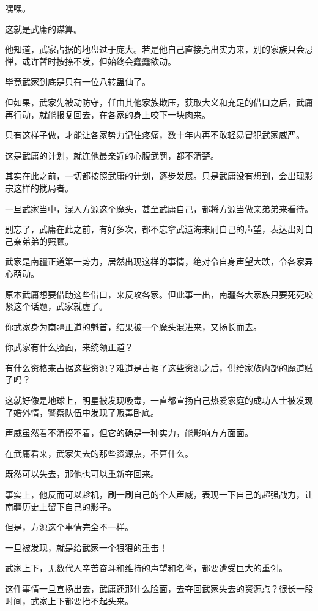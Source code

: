 \begin{this_body}
嘿嘿。

这就是武庸的谋算。

他知道，武家占据的地盘过于庞大。若是他自己直接亮出实力来，别的家族只会忌惮，或许暂时按捺不发，但始终会蠢蠢欲动。

毕竟武家到底是只有一位八转蛊仙了。

但如果，武家先被动防守，任由其他家族欺压，获取大义和充足的借口之后，武庸再行动，就能报复回去，在各家的身上咬下一块肉来。

只有这样子做，才能让各家势力记住疼痛，数十年内再不敢轻易冒犯武家威严。

这是武庸的计划，就连他最亲近的心腹武罚，都不清楚。

其实在此之前，一切都按照武庸的计划，逐步发展。只是武庸没有想到，会出现影宗这样的搅局者。

一旦武家当中，混入方源这个魔头，甚至武庸自己，都将方源当做亲弟弟来看待。

别忘了，武庸在此之前，有好多次，都不忘拿武遗海来刷自己的声望，表达出对自己亲弟弟的照顾。

武家是南疆正道第一势力，居然出现这样的事情，绝对令自身声望大跌，令各家异心萌动。

原本武庸想要借助这些借口，来反攻各家。但此事一出，南疆各大家族只要死死咬紧这个话题，武家就虚了。

你武家身为南疆正道的魁首，结果被一个魔头混进来，又扬长而去。

你武家有什么脸面，来统领正道？

有什么资格来占据这些资源？难道是占据了这些资源之后，供给家族内部的魔道贼子吗？

这就好像是地球上，明星被发现吸毒，一直都宣扬自己热爱家庭的成功人士被发现了婚外情，警察队伍中发现了贩毒卧底。

声威虽然看不清摸不着，但它的确是一种实力，能影响方方面面。

在武庸看来，武家失去的那些资源点，不算什么。

既然可以失去，那他也可以重新夺回来。

事实上，他反而可以趁机，刷一刷自己的个人声威，表现一下自己的超强战力，让南疆历史上留下自己的影子。

但是，方源这个事情完全不一样。

一旦被发现，就是给武家一个狠狠的重击！

武家上下，无数代人辛苦奋斗和维持的声望和名誉，都要遭受巨大的重创。

这件事情一旦宣扬出去，武庸还那什么脸面，去夺回武家失去的资源点？很长一段时间，武家上下都要抬不起头来。


\end{this_body}
